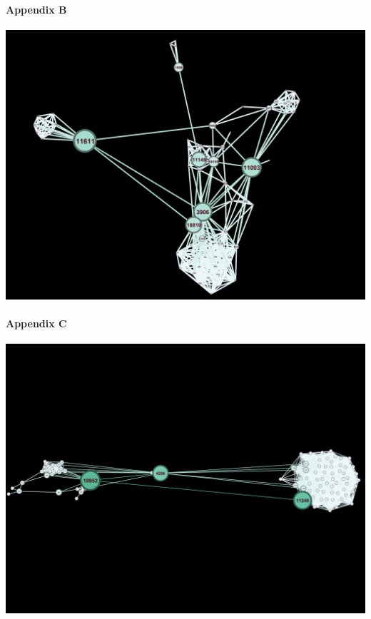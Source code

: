 \documentclass[11pt,twocolumn]{article}
\begin{document}
\paragraph{Appendix B\newline\newline}
\includegraphics[scale=0.22]{betweennesscentraility_politician.png}
\newline
\paragraph{Appendix C\newline\newline\newline\newline\newline}
\includegraphics[scale=0.22]{betweennesscentraility_tvshow.png}
\end{document}
